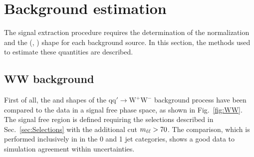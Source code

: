 \section{Background estimation}
\label{sec:Backgrounds}
The signal extraction procedure requires the determination of the normalization and the (\mll, \mt)
shape for each background source. In this section, the methods used to estimate these quantities are described.



\subsection{WW background \label{sec:WWBackground}}

First of all, the \mll and \mt shapes of the $\mathrm{qq'\to W^{+}W^{-}}$ background process have been compared to the data in a signal free phase space, as shown in Fig.~\ref{fig:WW}. The signal free region is defined requiring the selections described in Sec.~\ref{sec:Selections} with the additional cut $m_{\ell\ell}>70$\GeV. The comparison, which is performed inclusively in \pth in the 0 and 1 jet categories, shows a good data to simulation agreement within uncertainties.

